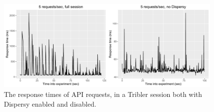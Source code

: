 \begin{figure}[h!]
	\centering
	\includegraphics[width=1.0\columnwidth]{images/experiments/request_times_comparison}
	\caption{The response times of API requests, in a Tribler session both with Dispersy enabled and disabled.}
	\label{fig:api-performance}
\end{figure}

